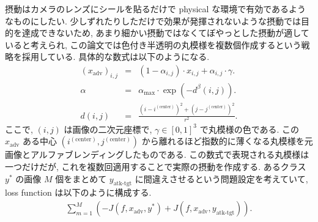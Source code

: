 摂動はカメラのレンズにシールを貼るだけで physical な環境で有効であるようなものにしたい.
少しずれたりしただけで効果が発揮されないような摂動では目的を達成できないため, あまり細かい摂動ではなくてぼやっとした摂動が適していると考えられ, この論文では色付き半透明の丸模様を複数個作成するという戦略を採用している.
具体的な数式は以下のようになる.
%
\begin{eqnarray}
(x_{\text{adv}})_{i,j} &=& (1 - \alpha_{i,j}) \cdot x_{i,j} + \alpha_{i,j} \cdot \gamma.
\label{eq:adversarial-camera-pi} \\
\alpha &=& \alpha_{\text{max}} \cdot \exp (- d^{\beta} (i,j)).
\label{eq:adversarial-camera-alpha} \\
d (i,j) &=& \frac{(i - i^{(\text{center})})^2 + (j - j^{(\text{center})})^2}{r^2}.
\label{eq:adversarial-camera-d}
\end{eqnarray}
%
ここで, $(i,j)$ は画像の二次元座標で, $\gamma \in [0, 1]^3$ で丸模様の色である.
この $x_{\text{adv}}$ ある中心 $(i^{(\text{center})}, j^{(\text{center})})$ から離れるほど指数的に薄くなる丸模様を元画像とアルファブレンディングしたものである.
この数式で表現される丸模様は一つだけだが, これを複数回適用することで実際の摂動を作成する.
あるクラス $y^{*}$ の画像 $M$ 個をまとめて $y_{\text{atk-tgt}}$ に間違えさせるという問題設定を考えていて, loss function は以下のように構成する.
%
\begin{eqnarray}
\sum_{m = 1}^{M} \left(- J(f, x_{\text{adv}}, y^*) + J(f, x_{\text{adv}}, y_{\text{atk-tgt}}) \right).
\label{eq:adversarial-camera-loss}
\end{eqnarray}
%

